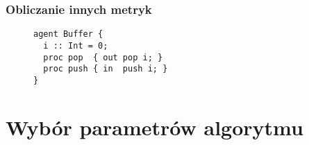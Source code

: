 \subsubsection{Obliczanie innych metryk}

\begin{figure}[!ht]
\lstset{caption=Parser gramatyki, captionpos=b}
\lstset{label=src:passive, frame=single}
\begin{lstlisting}
agent Buffer {
  i :: Int = 0;
  proc pop  { out pop i; }
  proc push { in  push i; }
}
\end{lstlisting}
\end{figure}


\section{Wybór parametrów algorytmu}

